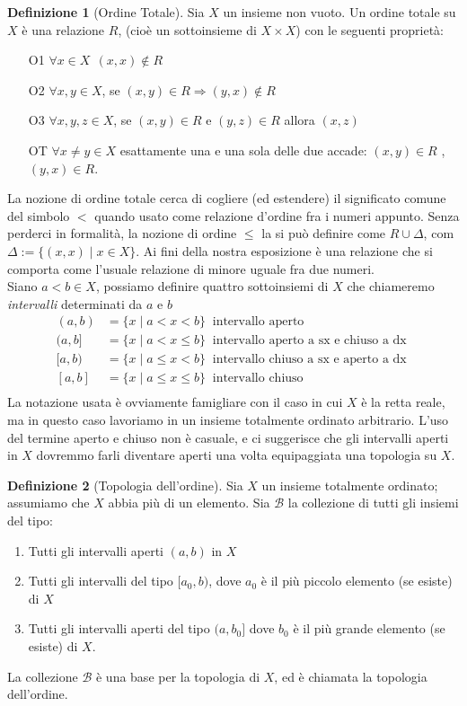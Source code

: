 \documentclass[10pt,a4paper]{article}
\theoremstyle{definition}
\newtheorem{defi}{Definizione}
\theoremstyle{plain}
\theoremstyle{remark}
\theoremstyle{remark}
\newcommand{\B}{\mathcal{B}}
\begin{document}
\begin{defi}[Ordine Totale] Sia $X$ un insieme non vuoto. Un ordine totale su
$X$ è una relazione $R$, (cioè un sottoinsieme di $X \times X$) con le seguenti
proprietà:
\begin{itemize}
\item[O1] $\forall x \in X \ \ (x,x) \notin R$
\item[O2] $\forall x,y \in X$, se $(x,y) \in R \Rightarrow (y,x) \notin R$
\item[O3] $\forall x,y,z \in X$, se $(x,y) \in R$ e $(y,z) \in R$ allora $(x,z)$
\item[OT] $ \forall x \neq y \in X$ esattamente una e una sola delle due accade:
$(x,y) \in R$ , $(y,x) \in R$.
\end{itemize}
\end{defi} La nozione di ordine totale cerca di cogliere (ed estendere) il
significato comune del simbolo $<$ quando usato come relazione d'ordine fra i
numeri appunto. Senza perderci in formalità, la nozione di ordine $\leq$ la si
può definire come $R \cup \Delta$, com $\Delta := \lbrace (x,x) \mid x \in X
\rbrace$. Ai fini della nostra esposizione è una relazione che si comporta come
l'usuale relazione di minore uguale fra due numeri.\\ Siano $a < b \in X$,
possiamo definire quattro sottoinsiemi di $X$ che chiameremo \textit{intervalli}
determinati da $a$ e $b$
\begin{align*} (a,b) &= \lbrace x \mid a < x < b \rbrace \ \text{ intervallo
aperto }\\ (a,b] &= \lbrace x \mid a < x \leq b \rbrace \ \text{ intervallo
aperto a sx e chiuso a dx }\\ [a,b) &= \lbrace x \mid a \leq x < b \rbrace \
\text{ intervallo chiuso a sx e aperto a dx }\\ [a,b] &= \lbrace x \mid a \leq x
\leq b \rbrace \ \text{ intervallo chiuso }\\
\end{align*} La notazione usata è ovviamente famigliare con il caso in cui $X$ è
la retta reale, ma in questo caso lavoriamo in un insieme totalmente ordinato
arbitrario. L'uso del termine aperto e chiuso non è casuale, e ci suggerisce che
gli intervalli aperti in $X$ dovremmo farli diventare aperti una volta
equipaggiata una topologia su $X$.

\begin{defi}[Topologia dell'ordine] Sia $X$ un insieme totalmente ordinato;
assumiamo che $X$ abbia più di un elemento. Sia $\B$ la collezione di tutti gli
insiemi del tipo:
\begin{enumerate}
\item Tutti gli intervalli aperti $(a,b)$ in $X$
\item Tutti gli intervalli del tipo $[a_0,b)$, dove $a_0$ è il più piccolo
elemento (se esiste) di $X$
\item Tutti gli intervalli aperti del tipo $(a,b_0]$ dove $b_0$ è il più grande
elemento (se esiste) di $X$.
\end{enumerate} La collezione $\B$ è una base per la topologia di $X$, ed è
chiamata la topologia dell'ordine.
\end{defi}
\end{document}
